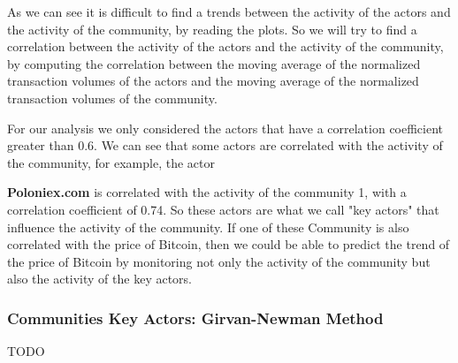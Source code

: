 \documentclass[a4paper, 12pt]{article}
\begin{document}
As we can see it is difficult to find a trends between the activity of the actors and the activity of the community, by reading the plots.
So we will try to find a correlation between the activity of the actors and the activity of the community,
by computing the correlation between the moving average of the normalized transaction volumes of the actors
and the moving average of the normalized transaction volumes of the community.

\newpage

\begin{table}[!htb]
    \begin{minipage}{0.5\linewidth}
        \centering
        \caption{Correlation Between Moving Average of Normalized Transaction Volumes}
        \label{tab:louvain_correlation_matrix}
    \end{minipage}%
    \hspace{0.05\linewidth} %
    \begin{minipage}{0.45\linewidth}
        For our analysis we only considered the actors that have a correlation coefficient greater than 0.6.
        We can see that some actors are correlated with the activity of the community, for example, the actor
    \end{minipage}
\end{table}
\textbf{Poloniex.com} is correlated with the activity of the community 1, with a correlation coefficient of 0.74. 
So these actors are what we call "key actors" that influence the activity of the community. If one of these Community
is also correlated with the price of Bitcoin, then we could be able to predict the trend of the price of Bitcoin by 
monitoring not only the activity of the community but also the activity of the key actors.

\newpage


\subsubsection{Communities Key Actors: Girvan-Newman Method}
TODO
\end{document}
